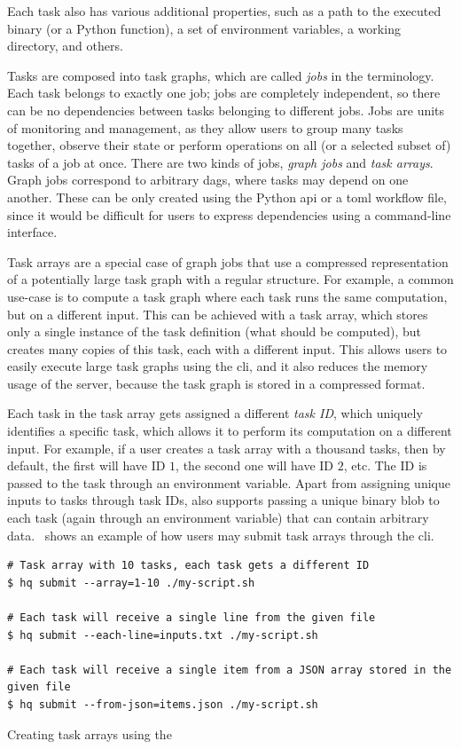 Each task also has various additional properties, such as a path to the executed binary (or a
Python function), a set of environment variables, a working directory, and others.

Tasks are composed into task graphs, which are called \emph{jobs} in the
\hq{} terminology. Each task belongs to exactly one job; jobs are completely
independent, so there can be no dependencies between tasks belonging to different jobs. Jobs are
units of monitoring and management, as they allow users to group many tasks together, observe their
state or perform operations on all (or a selected subset of) tasks of a job at once. There are two
kinds of jobs, \emph{graph jobs} and \emph{task arrays}. Graph jobs correspond to
arbitrary \glspl{dag}, where tasks may depend on one another. These can be only created
using the Python \gls{api} or a \gls{toml} workflow file, since it would
be difficult for users to express dependencies using a command-line interface.

Task arrays are a special case of graph jobs that use a compressed representation of a potentially
large task graph with a regular structure. For example, a common use-case is to compute a task
graph where each task runs the same computation, but on a different input. This can be achieved
with a task array, which stores only a single instance of the task definition (what should be
computed), but creates many copies of this task, each with a different input. This allows users to
easily execute large task graphs using the \gls{cli}, and it also reduces the memory
usage of the server, because the task graph is stored in a compressed format.

Each task in the task array gets assigned a different \emph{task ID}, which uniquely
identifies a specific task, which allows it to perform its computation on a different input. For
example, if a user creates a task array with a thousand tasks, then by default, the first will have
ID $1$, the second one will have ID $2$, etc. The ID is
passed to the task through an environment variable. Apart from assigning unique inputs to tasks
through task IDs, \hq{} also supports passing a unique binary blob to each task
(again through an environment variable) that can contain arbitrary data.~
shows an example of how users may submit task arrays through the \gls{cli}.

\begin{listing}[h]
	\begin{verbatim}
# Task array with 10 tasks, each task gets a different ID
$ hq submit --array=1-10 ./my-script.sh

# Each task will receive a single line from the given file
$ hq submit --each-line=inputs.txt ./my-script.sh

# Each task will receive a single item from a JSON array stored in the given file
$ hq submit --from-json=items.json ./my-script.sh
	\end{verbatim}
	\caption{Creating task arrays using the \hyperqueue{} }
	\label{lst:hq-cli-task-arrays}
\end{listing}

